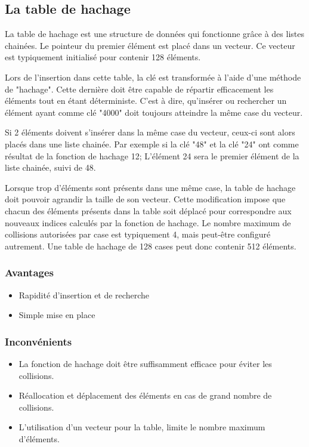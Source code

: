 \documentclass[hidelinks,a4paper, 12pt]{article}
\begin{document}
	\subsection{La table de hachage}
	La table de hachage est une structure de données qui fonctionne grâce à des listes chainées. Le pointeur du premier élément est placé dans un vecteur. Ce vecteur est typiquement initialisé pour contenir 128 éléments. 
	
	Lors de l'insertion dans cette table, la clé est transformée à l'aide d'une méthode de "hachage". Cette dernière doit être capable de répartir efficacement les éléments tout en étant déterministe. C'est à dire, qu'insérer ou rechercher un élément ayant comme clé "4000" doit toujours atteindre la même case du vecteur. 
	
	Si 2 éléments doivent s'insérer dans la même case du vecteur, ceux-ci sont alors placés dans une liste chainée. Par exemple si la clé "48" et la clé "24" ont comme résultat de la fonction de hachage 12; L'élément 24 sera le premier élément de la liste chainée, suivi de 48.
	
	Lorsque trop d'éléments sont présents dans une même case, la table de hachage doit pouvoir agrandir la taille de son vecteur. Cette modification impose que chacun des éléments présents dans la table soit déplacé pour correspondre aux nouveaux indices calculés par la fonction de hachage. Le nombre maximum de collisions autorisées par case est typiquement 4, mais peut-être configuré autrement. Une table de hachage de 128 cases peut donc contenir 512 éléments. 
	
	
	
	
	\subsubsection*{Avantages}
	\begin{itemize}
		\item Rapidité d'insertion et de recherche
		\item Simple mise en place 
	\end{itemize}
	\subsubsection*{Inconvénients}
	\begin{itemize}
		\item La fonction de hachage doit être suffisamment efficace pour éviter les collisions.
		\item Réallocation et déplacement des éléments en cas de grand nombre de collisions.
		\item L'utilisation d'un vecteur pour la table, limite le nombre maximum d'éléments.
	\end{itemize}
\end{document}
